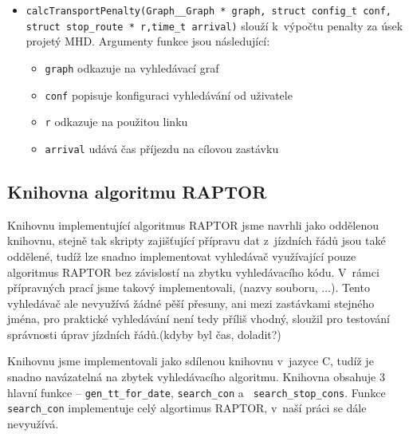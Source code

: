 \begin{itemize}
{	conf, Graph\_\_Edge * edge)} slouží k~výpočtu penalty za pěší úsek.
	Argumenty funkce jsou následující:
	\begin{itemize}
		\item {\tt graph} odkazuje na vyhledávací graf
		\item {\tt conf} popisuje konfiguraci vyhledávání od uživatele
		\item {\tt edge} odkazuje na hranu, pro kterou počítáme penaltu
	\end{itemize}
	\item {\tt calcTransportPenalty(Graph\_\_Graph * graph, struct config\_t
	conf, struct stop\_route * r,time\_t arrival)} slouží k~výpočtu penalty
	za úsek projetý MHD. Argumenty funkce jsou následující:
	\begin{itemize}
		\item {\tt graph} odkazuje na vyhledávací graf
		\item {\tt conf} popisuje konfiguraci vyhledávání od uživatele
		\item {\tt r} odkazuje na použitou linku
		\item {\tt arrival} udává čas příjezdu na cílovou zastávku
	\end{itemize}
\end{itemize}

\subsection{Knihovna algoritmu RAPTOR}
Knihovnu implementující algoritmus RAPTOR jsme navrhli jako oddělenou knihovnu,
stejně tak skripty zajišťující přípravu dat z~jízdních řádů jsou také oddělené,
tudíž lze snadno implementovat vyhledávač využívající pouze algoritmus RAPTOR
bez závislostí na zbytku vyhledávacího kódu. V~rámci přípravných prací jsme
takový implementovali, (\TODO nazvy souboru, ...). Tento vyhledávač ale
nevyužívá žádné pěší přesuny, ani mezi zastávkami stejného jména, pro praktické
vyhledávání není tedy příliš vhodný, sloužil pro testování správnosti úprav
jízdních řádů.(\TODO kdyby byl čas, doladit?)

Knihovnu jsme implementovali jako sdílenou knihovnu v~jazyce C, tudíž je snadno
navázatelná na zbytek vyhledávacího algoritmu. Knihovna obsahuje 3 hlavní
funkce -- {\tt gen\_tt\_for\_date}, {\tt search\_con} a {\tt
search\_stop\_cons}. Funkce {\tt search\_con} implementuje celý algortimus
RAPTOR, v~naší práci se dále nevyužívá.

